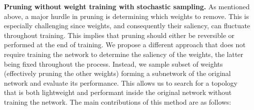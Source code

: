 \noindent \textbf{Pruning without weight training with stochastic sampling.} As
mentioned above, a major hurdle in pruning is determining which weights to
remove. This is especially challenging since weights, and consequently their
saliency, can fluctuate throughout training. This implies that pruning should
either be reversible or performed at the end of training. We propose a different
approach that does not require training the network to determine the saliency of
the weights, the latter being fixed throughout the process. Instead, we sample
subset of weights (effectively pruning the other weights) forming a subnetwork
of the original network and evaluate its performance. This allows us to search
for a topology that is both lightweight and performant inside the original
network without training the network. The main contributions of this method are
as follows: \\

